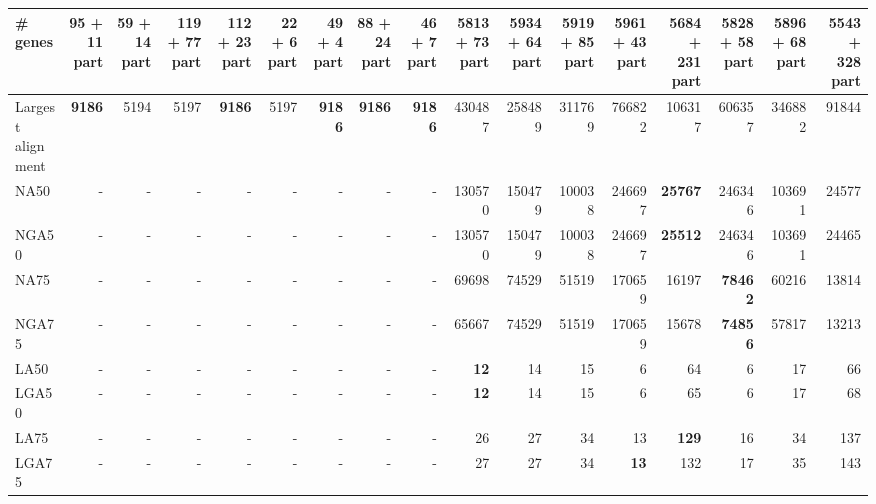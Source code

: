 \documentclass[12pt,a4paper]{article}
\begin{document}
\begin{table}[ht]
\begin{center}
\begin{tabular}{|l*{16}{|r}|}
\# genes & {\bf 95 + 11 part} & 59 + 14 part & 119 + 77 part & 112 + 23 part & 22 + 6 part & 49 + 4 part & 88 + 24 part & 46 + 7 part & 5813 + 73 part & 5934 + 64 part & 5919 + 85 part & 5961 + 43 part & 5684 + 231 part & 5828 + 58 part & 5896 + 68 part & 5543 + 328 part \\ \hline
Largest alignment & {\bf 9186} & 5194 & 5197 & {\bf 9186} & 5197 & {\bf 9186} & {\bf 9186} & {\bf 9186} & 430487 & 258489 & 311769 & 766822 & 106317 & 606357 & 346882 & 91844 \\ \hline
NA50 & - & - & - & - & - & - & - & - & 130570 & 150479 & 100038 & 246697 & {\bf 25767} & 246346 & 103691 & 24577 \\ \hline
NGA50 & - & - & - & - & - & - & - & - & 130570 & 150479 & 100038 & 246697 & {\bf 25512} & 246346 & 103691 & 24465 \\ \hline
NA75 & - & - & - & - & - & - & - & - & 69698 & 74529 & 51519 & 170659 & 16197 & {\bf 78462} & 60216 & 13814 \\ \hline
NGA75 & - & - & - & - & - & - & - & - & 65667 & 74529 & 51519 & 170659 & 15678 & {\bf 74856} & 57817 & 13213 \\ \hline
LA50 & - & - & - & - & - & - & - & - & {\bf 12} & 14 & 15 & 6 & 64 & 6 & 17 & 66 \\ \hline
LGA50 & - & - & - & - & - & - & - & - & {\bf 12} & 14 & 15 & 6 & 65 & 6 & 17 & 68 \\ \hline
LA75 & - & - & - & - & - & - & - & - & 26 & 27 & 34 & 13 & {\bf 129} & 16 & 34 & 137 \\ \hline
LGA75 & - & - & - & - & - & - & - & - & 27 & 27 & 34 & {\bf 13} & 132 & 17 & 35 & 143 \\ \hline
\end{tabular}
\end{center}
\end{table}
\end{document}
